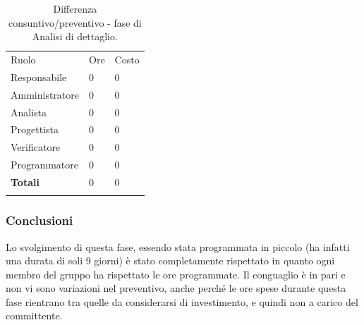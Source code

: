 \documentclass[a4paper]{article}
\begin{document}
			\begin{table}[H]
				\begin{tabularx}{\textwidth}{Y Y Y}
					Ruolo & Ore & Costo \\
					Responsabile & 0 & 0 \\
					Amministratore & 0 & 0 \\
					Analista & 0 & 0\\
					Progettista & 0 & 0\\
					Verificatore & 0 & 0\\
					Programmatore & 0 & 0 \\
					\textbf{Totali} & 0 & 0 \\
				\end{tabularx}
				\caption{Differenza consuntivo/preventivo - fase di Analisi di dettaglio. } 
				\label{ConsuntivoDettaglio}
			\end{table}
			
			\subsubsection{Conclusioni}
				Lo svolgimento di questa fase, essendo stata programmata in piccolo (ha infatti una durata di soli 9 giorni) è stato
				completamente rispettato in quanto ogni membro del gruppo ha rispettato le ore programmate. Il conguaglio è in pari e non 
				vi sono variazioni nel preventivo, anche perché le ore spese durante questa fase rientrano tra quelle da considerarsi di 
				investimento, e quindi non a carico del committente. 
			
		
\end{document}
